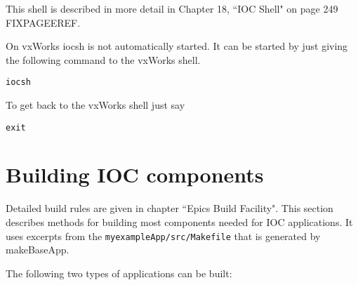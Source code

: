 This shell is described in more detail in Chapter 18, ``IOC Shell" on page 249 FIXPAGEEREF.

On vxWorks iocsh is not automatically started. It can be started by just giving the following command to the vxWorks 
shell.

\begin{verbatim}
iocsh
\end{verbatim}
To get back to the vxWorks shell just say

\begin{verbatim}
exit
\end{verbatim}

\section{Building IOC components}

Detailed build rules are given in chapter ``Epics Build Facility". This section describes methods for building most 
components needed for IOC applications. It uses excerpts from the \verb|myexampleApp/src/Makefile| that is generated by 
makeBaseApp.

The following two types of applications can be built:

